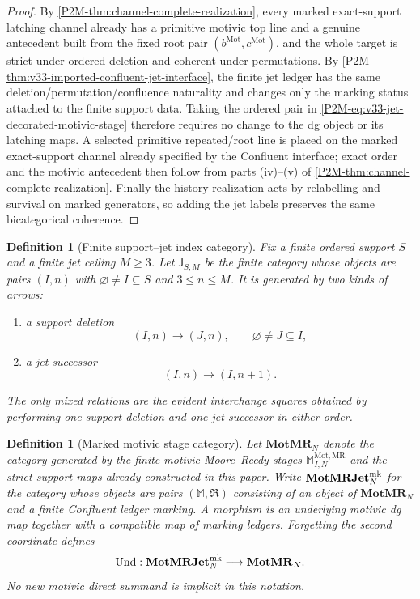 \documentclass[11pt]{article}
\newtheorem{definition}[theorem]{Definition}
\theoremstyle{remark}
\newcommand{\Mot}{\mathrm{Mot}}
\newcommand{\MR}{\mathrm{MR}}
\begin{document}
\begin{proof}
By \cref{P2M-thm:channel-complete-realization}, every marked exact-support latching
channel already has a primitive motivic top line and a genuine antecedent built
from the fixed root pair $(b^{\Mot},c^{\Mot})$, and the whole target is strict
under ordered deletion and coherent under permutations.  By
\cref{P2M-thm:v33-imported-confluent-jet-interface}, the finite jet ledger has the
same deletion/permutation/confluence naturality and changes only the marking
status attached to the finite support data.  Taking the ordered pair in
\eqref{P2M-eq:v33-jet-decorated-motivic-stage} therefore requires no change to the
dg object or its latching maps.  A selected primitive repeated/root line is
placed on the marked exact-support channel already specified by the Confluent
interface; exact order and the motivic antecedent then follow from parts
\textup{(iv)--(v)} of \cref{P2M-thm:channel-complete-realization}.  Finally the
history realization acts by relabelling and survival on marked generators, so
adding the jet labels preserves the same bicategorical coherence.
\end{proof}


\begin{definition}[Finite support--jet index category]
\label{P2M-def:v34-support-jet-index}
Fix a finite ordered support $S$ and a finite jet ceiling $M\ge3$.  Let
$\mathsf J_{S,M}$ be the finite category whose objects are pairs $(I,n)$ with
$\varnothing\ne I\subseteq S$ and $3\le n\le M$.  It is generated by two
kinds of arrows:
\begin{enumerate}[label=\textup{(\alph*)}]
\item a support deletion
\[
 (I,n)\longrightarrow(J,n),\qquad \varnothing\ne J\subseteq I,
\]
\item a jet successor
\[
 (I,n)\longrightarrow(I,n+1).
\]
\end{enumerate}
The only mixed relations are the evident interchange squares obtained by
performing one support deletion and one jet successor in either order.
\end{definition}

\begin{definition}[Marked motivic stage category]
\label{P2M-def:v34-marked-motivic-stage-category}
Let $\mathbf{MotMR}_N$ denote the category generated by the finite motivic
Moore--Reedy stages $\mathbb M_{I,N}^{\Mot,\MR}$ and the strict support maps
already constructed in this paper.  Write $\mathbf{MotMRJet}^{\rm mk}_N$ for
the category whose objects are pairs $(\mathbb M,\mathfrak R)$ consisting of
an object of $\mathbf{MotMR}_N$ and a finite Confluent ledger marking.  A
morphism is an underlying motivic dg map together with a compatible map of
marking ledgers.  Forgetting the second coordinate defines
\[
 \operatorname{Und}:\mathbf{MotMRJet}^{\rm mk}_N
 \longrightarrow\mathbf{MotMR}_N.
\]
No new motivic direct summand is implicit in this notation.
\end{definition}
\end{document}

